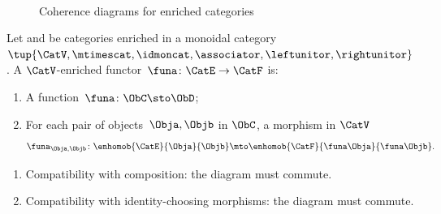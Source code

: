 \begin{figure}[h!]
    \\
    \caption{Coherence diagrams for enriched categories}
    \label{fig:diagrams-enriched-category}
\end{figure}

\begin{ctdefinition}
    \label{def:enrichedfunctor}

    Let \CatE and \CatF be categories enriched in a monoidal category $\tup{\CatV, \mtimescat, \idmoncat, \associator, \leftunitor, \rightunitor}$.
    A $\CatV$-enriched functor~$\funa\colon \CatE \to \CatF$ is:

    \constit
    \begin{enumerate}
        \item A function~$\funa\colon \ObC \sto \ObD$;
        \item For each pair of objects~$\Obja, \Objb$ in $\ObC$, a morphism in $\CatV$
              \begin{equation}
                  \funa_{\Obja, \Objb} \colon \enhomob{\CatE}{\Obja}{\Objb} \mto \enhomob{\CatF}{\funa \Obja}{\funa \Objb}.
              \end{equation}
    \end{enumerate}

    \condit
    \begin{enumerate}
        \item Compatibility with composition: the diagram
              must commute.
        \item Compatibility with identity-choosing morphisms: the diagram
              must commute.
    \end{enumerate}
\end{ctdefinition}

